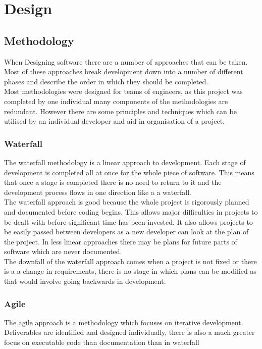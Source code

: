 \documentclass{article}
\begin{document}
\section{Design}

\subsection{Methodology}
When Designing software there are a number of approaches that can be taken. Most of these approaches break development down into a number of different phases and describe the order in which they should be completed.\\

Most methodologies were designed for teams of engineers, as this project was completed by one individual many components of the methodologies are redundant. However there are some principles and techniques which can be utilised by an individual developer and aid in organisation of a project.

\subsubsection{Waterfall}
The waterfall methodology is a linear approach to development. Each stage of development is completed all at once for the whole piece of software. This means that once a stage is completed there is no need to return to it and the development process flows in one direction like a a waterfall.\\

The waterfall approach is good because the whole project is rigorously planned and documented before coding begins. This allows major difficulties in projects to be dealt with before significant time has been invested. It also allows projects to be easily passed between developers as a new developer can look at the plan of the project. In less linear approaches there may be plans for future parts of software which are never documented.\\

The downfall of the waterfall approach comes when a project is not fixed or there is a a change in requirements, there is no stage in which plans can be modified as that would involve going backwards in development.\\


\subsubsection{Agile}
The agile approach is a methodology which focuses on iterative development. Deliverables are identified and designed individually, there is also a much greater focus on executable code than documentation than in waterfall\\
\end{document}
